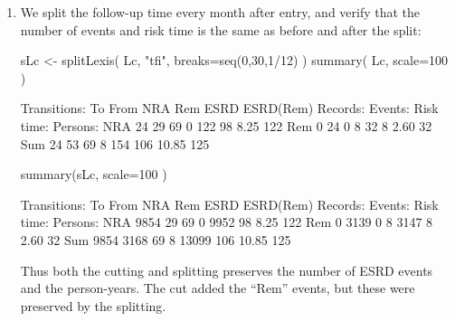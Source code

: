 \begin{enumerate}[resume]

  
\item We split the follow-up time every month after entry, and verify
  that the number of events and risk time is the same as before and
  after the split:
\begin{Schunk}
\begin{Sinput}
 sLc <- splitLexis( Lc, "tfi", breaks=seq(0,30,1/12) )
 summary( Lc, scale=100 )
\end{Sinput}
\begin{Soutput}
Transitions:
     To
From  NRA Rem ESRD ESRD(Rem)  Records:  Events: Risk time:  Persons:
  NRA  24  29   69         0       122       98       8.25       122
  Rem   0  24    0         8        32        8       2.60        32
  Sum  24  53   69         8       154      106      10.85       125
\end{Soutput}
\begin{Sinput}
 summary(sLc, scale=100 )
\end{Sinput}
\begin{Soutput}
Transitions:
     To
From   NRA  Rem ESRD ESRD(Rem)  Records:  Events: Risk time:  Persons:
  NRA 9854   29   69         0      9952       98       8.25       122
  Rem    0 3139    0         8      3147        8       2.60        32
  Sum 9854 3168   69         8     13099      106      10.85       125
\end{Soutput}
\end{Schunk}
  Thus both the cutting and splitting preserves the number of ESRD
  events and the person-years. The cut added the ``Rem'' events, but
  these were preserved by the splitting.



\end{enumerate}
